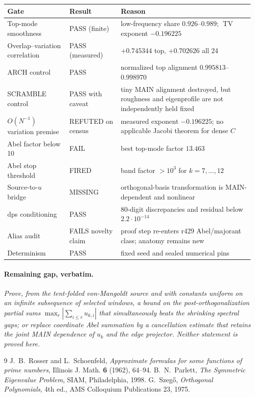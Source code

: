 \documentclass[11pt]{article}
\theoremstyle{remark}
\newcommand{\TV}{\operatorname{TV}}
\begin{document}
\begin{center}
\begin{tabular}{@{}p{4.1cm}p{2.1cm}p{8.2cm}@{}}
\toprule
Gate&Result&Reason\\
\midrule
Top-mode smoothness&PASS (finite)&low-frequency share
$0.926$--$0.989$; $\TV$ exponent $-0.196225$\\
Overlap--variation correlation&PASS (measured)&
$+0.745344$ top, $+0.702626$ all 24\\
ARCH control&PASS&normalized top alignment
$0.995813$--$0.998970$\\
SCRAMBLE control&PASS with caveat&tiny MAIN alignment destroyed,
but roughness and eigenprofile are not independently held fixed\\
$O(N^{-1})$ variation premise&REFUTED on census&measured exponent
$-0.196225$; no applicable Jacobi theorem for dense $C$\\
Abel factor below 10&FAIL&best top-mode factor $13.463$\\
Abel stop threshold&FIRED&band factor $>10^3$ for $k=7,\ldots,12$\\
Source-to-$u$ bridge&MISSING&orthogonal-basis transformation is
MAIN-dependent and nonlinear\\
dps conditioning&PASS&80-digit discrepancies and residual below
$2.2\cdot10^{-14}$\\
Alias audit&FAILS novelty claim&proof step re-enters r429 Abel/majorant
class; anatomy remains new\\
Determinism&PASS&fixed seed and sealed numerical pins\\
\bottomrule
\end{tabular}
\end{center}

\paragraph{Remaining gap, verbatim.}
\emph{Prove, from the tent-folded von-Mangoldt source and with constants
uniform on an infinite subsequence of selected windows, a bound on the
post-orthogonalization partial sums
$\max_r|\sum_{i\le r}u_{k,i}|$ that simultaneously beats the shrinking
spectral gaps; or replace coordinate Abel summation by a cancellation
estimate that retains the joint MAIN dependence of $u_k$ and the edge
projector.  Neither statement is proved here.}

\begin{thebibliography}{9}
J.~B.~Rosser and L.~Schoenfeld,
\emph{Approximate formulas for some functions of prime numbers},
Illinois J. Math. \textbf{6} (1962), 64--94.
B.~N.~Parlett,
\emph{The Symmetric Eigenvalue Problem},
SIAM, Philadelphia, 1998.
G.~Szeg\H{o},
\emph{Orthogonal Polynomials}, 4th ed.,
AMS Colloquium Publications 23, 1975.
\end{thebibliography}
\end{document}
